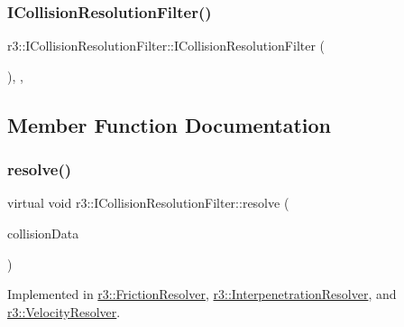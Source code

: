 \mbox{\label{classr3_1_1_i_collision_resolution_filter_ab2dcf60620e28db288abf19bdeeb11ad}} 
\subsubsection{\texorpdfstring{I\+Collision\+Resolution\+Filter()}{ICollisionResolutionFilter()}}
{\footnotesize\ttfamily r3\+::\+I\+Collision\+Resolution\+Filter\+::\+I\+Collision\+Resolution\+Filter (\begin{DoxyParamCaption}{ }\end{DoxyParamCaption})\hspace{0.3cm}{\ttfamily [explicit]}, {\ttfamily [protected]}, {\ttfamily [default]}}



\subsection{Member Function Documentation}
\mbox{\label{classr3_1_1_i_collision_resolution_filter_a9ae35c07c585500c409459ef87e5ae15}} 
\subsubsection{\texorpdfstring{resolve()}{resolve()}}
{\footnotesize\ttfamily virtual void r3\+::\+I\+Collision\+Resolution\+Filter\+::resolve (\begin{DoxyParamCaption}\item[{const \mbox{\hyperlink{classr3_1_1_collision_data}{Collision\+Data}} \&}]{collision\+Data }\end{DoxyParamCaption})\hspace{0.3cm}{\ttfamily [pure virtual]}}



Implemented in \mbox{\hyperlink{classr3_1_1_friction_resolver_aa6c4e02ba5ec9759eea10900cdcf44f5}{r3\+::\+Friction\+Resolver}}, \mbox{\hyperlink{classr3_1_1_interpenetration_resolver_a7a5dfd8678e5b056ec0978e857cca0ef}{r3\+::\+Interpenetration\+Resolver}}, and \mbox{\hyperlink{classr3_1_1_velocity_resolver_ad3fa33c02dfa07c760ca9bc5c89f49c3}{r3\+::\+Velocity\+Resolver}}.



